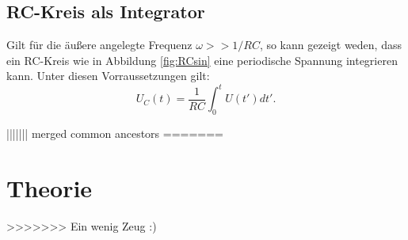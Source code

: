 \subsection{RC-Kreis als Integrator}
Gilt für die äußere angelegte Frequenz $\omega >> 1/RC$, so kann gezeigt weden, dass
ein RC-Kreis wie in Abbildung \ref{fig:RCsin} eine periodische Spannung integrieren kann.
Unter diesen Vorraussetzungen gilt:
\begin{equation}
  U_{C}(t)=\frac{1}{RC}\int_{0}^{t} U(t')dt'.
  \label{eqn:integral}
\end{equation}

\label{sec:Theorie}

||||||| merged common ancestors
=======
\section{Theorie}
\label{sec:Theorie}

\cite{sample}
>>>>>>> Ein wenig Zeug :)
